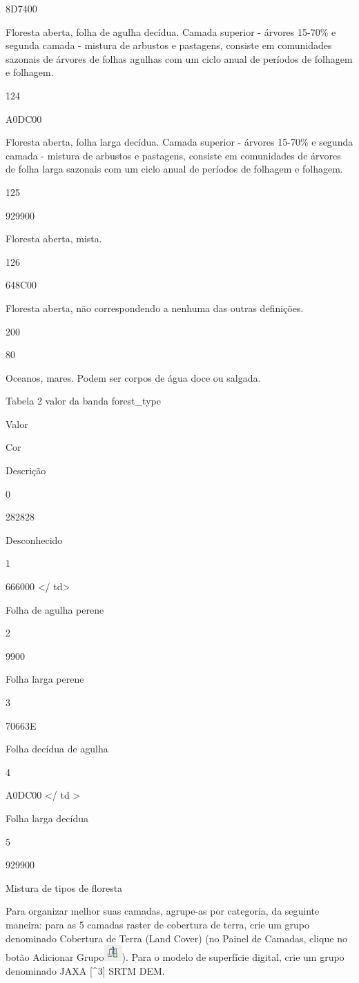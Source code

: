\documentclass[
  portuguese,
]{krantz}
\begin{document}
8D7400

Floresta aberta, folha de agulha decídua. Camada superior - árvores 15-70\% e segunda camada - mistura de arbustos e pastagens, consiste em comunidades sazonais de árvores de folhas agulhas com um ciclo anual de períodos de folhagem e folhagem.

124

A0DC00

Floresta aberta, folha larga decídua. Camada superior - árvores 15-70\% e segunda camada - mistura de arbustos e pastagens, consiste em comunidades de árvores de folha larga sazonais com um ciclo anual de períodos de folhagem e folhagem.

125

929900

Floresta aberta, mista.

126

648C00

Floresta aberta, não correspondendo a nenhuma das outras definições.

200

80

Oceanos, mares. Podem ser corpos de água doce ou salgada.

Tabela 2 valor da banda forest\_type

Valor

Cor

Descrição

0

282828

Desconhecido

1

666000
\textless/ td\textgreater{}

Folha de agulha perene

2

9900

Folha larga perene

3

70663E

Folha decídua de agulha

4

A0DC00
\textless/ td \textgreater{}

Folha larga decídua

5

929900

Mistura de tipos de floresta

Para organizar melhor suas camadas, agrupe-as por categoria, da seguinte maneira: para as 5 camadas raster de cobertura de terra, crie um grupo denominado Cobertura de Terra (Land Cover) (no Painel de Camadas, clique no botão Adicionar Grupo\includegraphics{media/modulo9/add-group-btn.png}). Para o modelo de superfície digital, crie um grupo denominado JAXA {[}\^{}3{]} SRTM DEM.
\end{document}
